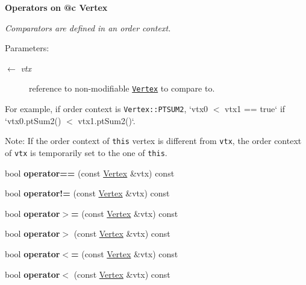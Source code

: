 \begin{Indent}{\bf Operators on @c Vertex}\par
{\em Comparators are defined in an order context.

\begin{Desc}
\item[Parameters:]
\begin{description}
\item[\mbox{$\leftarrow$} {\em vtx}]reference to non-modifiable {\tt \hyperlink{classVertex}{Vertex}} to compare to.\end{description}
\end{Desc}
For example, if order context is {\tt Vertex::PTSUM2}, `vtx0 $<$ vtx1 == true` if `vtx0.pt\-Sum2() $<$ vtx1.pt\-Sum2()`.

\begin{Desc}
\item[Note:]If the order context of {\tt this} vertex is different from {\tt vtx}, the order context of {\tt vtx} is temporarily set to the one of {\tt this}. \end{Desc}
}\begin{CompactItemize}
\item 
\hypertarget{classVertex_6d2e7e5f15d5c414d4059b774d51a833}{
bool \textbf{operator==} (const \hyperlink{classVertex}{Vertex} \&vtx) const }
\label{classVertex_6d2e7e5f15d5c414d4059b774d51a833}

\item 
\hypertarget{classVertex_23dff1a8b545d1db7ecd42a67bf37d85}{
bool \textbf{operator!=} (const \hyperlink{classVertex}{Vertex} \&vtx) const }
\label{classVertex_23dff1a8b545d1db7ecd42a67bf37d85}

\item 
\hypertarget{classVertex_4f83b693c07930515091355c3c1a71f4}{
bool \textbf{operator$>$=} (const \hyperlink{classVertex}{Vertex} \&vtx) const }
\label{classVertex_4f83b693c07930515091355c3c1a71f4}

\item 
\hypertarget{classVertex_b170c5c264e5a8e4ea9fcabc23e0db5e}{
bool \textbf{operator$>$} (const \hyperlink{classVertex}{Vertex} \&vtx) const }
\label{classVertex_b170c5c264e5a8e4ea9fcabc23e0db5e}

\item 
\hypertarget{classVertex_3a96d3ee87e8dd126f63fb43d9e68a27}{
bool \textbf{operator$<$=} (const \hyperlink{classVertex}{Vertex} \&vtx) const }
\label{classVertex_3a96d3ee87e8dd126f63fb43d9e68a27}

\item 
\hypertarget{classVertex_e597699a1d5a9e6fc51daf4d86286e11}{
bool \textbf{operator$<$} (const \hyperlink{classVertex}{Vertex} \&vtx) const }
\label{classVertex_e597699a1d5a9e6fc51daf4d86286e11}

\end{CompactItemize}
\end{Indent}
